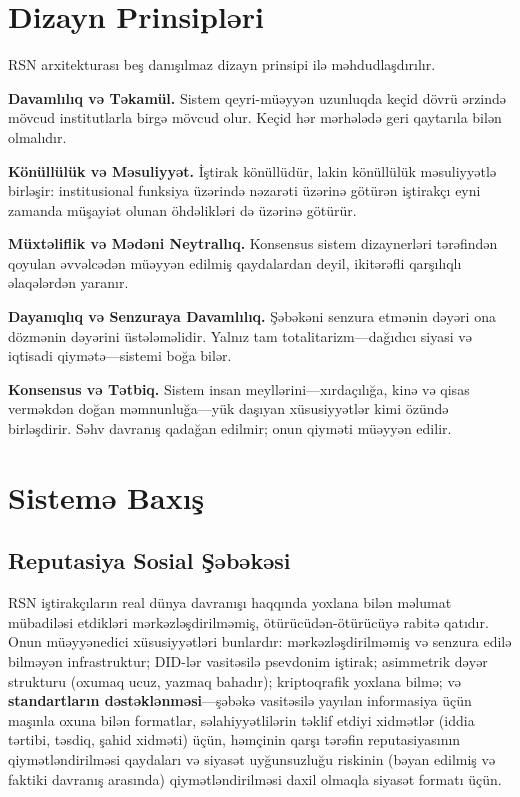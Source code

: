 \documentclass[11pt,a4paper,twocolumn]{article}
\begin{document}
\section{Dizayn Prinsipləri}

RSN arxitekturası beş danışılmaz dizayn prinsipi ilə məhdudlaşdırılır.

\textbf{Davamlılıq və Təkamül.} Sistem qeyri-müəyyən uzunluqda keçid dövrü ərzində mövcud institutlarla birgə mövcud olur. Keçid hər mərhələdə geri qaytarıla bilən olmalıdır.

\textbf{Könüllülük və Məsuliyyət.} İştirak könüllüdür, lakin könüllülük məsuliyyətlə birləşir: institusional funksiya üzərində nəzarəti üzərinə götürən iştirakçı eyni zamanda müşayiət olunan öhdəlikləri də üzərinə götürür.

\textbf{Müxtəliflik və Mədəni Neytrallıq.} Konsensus sistem dizaynerləri tərəfindən qoyulan əvvəlcədən müəyyən edilmiş qaydalardan deyil, ikitərəfli qarşılıqlı əlaqələrdən yaranır.

\textbf{Dayanıqlıq və Senzuraya Davamlılıq.} Şəbəkəni senzura etmənin dəyəri ona dözmənin dəyərini üstələməlidir. Yalnız tam totalitarizm---dağıdıcı siyasi və iqtisadi qiymətə---sistemi boğa bilər.

\textbf{Konsensus və Tətbiq.} Sistem insan meyllərini---xırdaçılığa, kinə və qisas verməkdən doğan məmnunluğa---yük daşıyan xüsusiyyətlər kimi özündə birləşdirir. Səhv davranış qadağan edilmir; onun qiyməti müəyyən edilir.

\section{Sistemə Baxış}

\subsection{Reputasiya Sosial Şəbəkəsi}

RSN iştirakçıların real dünya davranışı haqqında yoxlana bilən məlumat mübadiləsi etdikləri mərkəzləşdirilməmiş, ötürücüdən-ötürücüyə rabitə qatıdır. Onun müəyyənedici xüsusiyyətləri bunlardır: mərkəzləşdirilməmiş və senzura edilə bilməyən infrastruktur; DID-lər vasitəsilə psevdonim iştirak; asimmetrik dəyər strukturu (oxumaq ucuz, yazmaq bahadır); kriptoqrafik yoxlana bilmə; və \textbf{standartların dəstəklənməsi}---şəbəkə vasitəsilə yayılan informasiya üçün maşınla oxuna bilən formatlar, səlahiyyətlilərin təklif etdiyi xidmətlər (iddia tərtibi, təsdiq, şahid xidməti) üçün, həmçinin qarşı tərəfin reputasiyasının qiymətləndirilməsi qaydaları və siyasət uyğunsuzluğu riskinin (bəyan edilmiş və faktiki davranış arasında) qiymətləndirilməsi daxil olmaqla siyasət formatı üçün.
\end{document}
